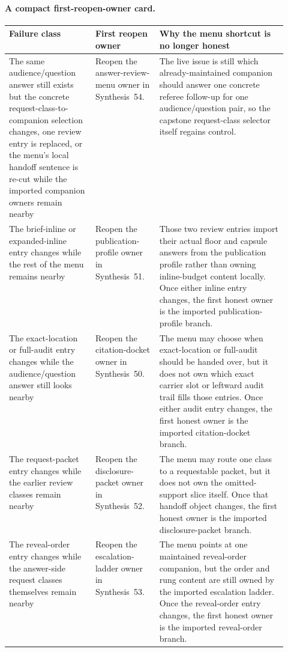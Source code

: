 \documentclass[11pt]{article}
\begin{document}
\paragraph{A compact first-reopen-owner card.}
\begin{table}[t]
\centering
\small
\begin{tabularx}{\linewidth}{@{}p{0.31\linewidth}p{0.23\linewidth}X@{}}
\toprule
Failure class & First reopen owner & Why the menu shortcut is no longer honest \\
\midrule
The same audience/question answer still exists but the concrete request-class-to-companion selection changes, one review entry is replaced, or the menu's local handoff sentence is re-cut while the imported companion owners remain nearby & Reopen the answer-review-menu owner in Synthesis~54. & The live issue is still which already-maintained companion should answer one concrete referee follow-up for one audience/question pair, so the capstone request-class selector itself regains control. \\
The brief-inline or expanded-inline entry changes while the rest of the menu remains nearby & Reopen the publication-profile owner in Synthesis~51. & Those two review entries import their actual floor and capsule answers from the publication profile rather than owning inline-budget content locally. Once either inline entry changes, the first honest owner is the imported publication-profile branch. \\
The exact-location or full-audit entry changes while the audience/question answer still looks nearby & Reopen the citation-docket owner in Synthesis~50. & The menu may choose when \textsf{exact-location} or \textsf{full-audit} should be handed over, but it does not own which exact carrier slot or leftward audit trail fills those entries. Once either audit entry changes, the first honest owner is the imported citation-docket branch. \\
The request-packet entry changes while the earlier review classes remain nearby & Reopen the disclosure-packet owner in Synthesis~52. & The menu may route one class to a requestable packet, but it does not own the omitted-support slice itself. Once that handoff object changes, the first honest owner is the imported disclosure-packet branch. \\
The reveal-order entry changes while the answer-side request classes themselves remain nearby & Reopen the escalation-ladder owner in Synthesis~53. & The menu points at one maintained reveal-order companion, but the order and rung content are still owned by the imported escalation ladder. Once the reveal-order entry changes, the first honest owner is the imported reveal-order branch. \\

\end{tabularx}
\end{table}
\end{document}
